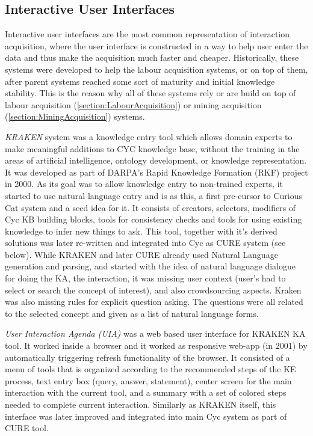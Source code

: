 \subsection{Interactive User Interfaces}
Interactive user interfaces are the most common representation of interaction acquisition, where the user interface is constructed in a way to help user enter the data and thus make the acquisition much faster and cheaper. Historically, these systems were developed to help the labour acquisition systems, or on top of them, after parent systems reached some sort of maturity and initial knowledge stability. This is the reason why all of these systems rely or are build on top of labour acquisition (\autoref{section:LabourAcquisition}) or mining acquisition (\autoref{section:MiningAcquisition}) systems.

\emph{KRAKEN} system was a knowledge entry tool which allows domain experts to make meaningful additions to CYC knowledge base, without the training in the areas of artificial intelligence, ontology development, or knowledge representation\parencite{Panton2002a}. It was developed as part of DARPA's Rapid Knowledge Formation (RKF) project in 2000. As its goal was to allow knowledge entry to non-trained experts, it started to use natural language entry and is as this, a first pre-cursor to Curious Cat system and a seed idea for it. It consists of creators, selectors, modifiers of Cyc KB building blocks, tools for consistency checks and tools for using existing knowledge to infer new things to ask. This tool, together with it's derived solutions was later re-written and integrated into Cyc as CURE system (see below). While KRAKEN and later CURE already used Natural Language generation and parsing, and started with the idea of natural language dialogue for doing the KA, the interaction, it was missing user context (user's had to select or search the concept of interest), and also crowdsourcing aspects. Kraken was also missing rules for explicit question asking. The questions were all related to the selected concept and given as a list of natural language forms.

\emph{User Interaction Agenda (UIA)} was a web  based user interface for KRAKEN KA tool\parencite{Panton2002a,Witbrock2003UIA}. It worked inside a browser and it worked as responsive web-app (in 2001) by automatically triggering refresh functionality of the browser. It
consisted of a menu of tools that is organized according to the recommended
steps of the KE process, text entry box (query, answer, statement), center screen for the main interaction with the current tool, and a summary with a set of colored steps needed to complete current interaction. Similarly as KRAKEN itself, this interface was later improved and integrated into main Cyc system as part of CURE tool. 

